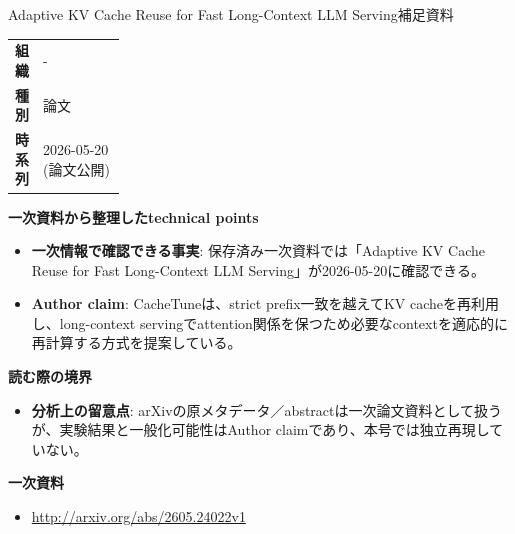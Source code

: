 \begin{technicalnote}{Adaptive KV Cache Reuse for Fast Long-Context LLM Serving}{補足資料}
\begingroup
\begin{tabularx}{\linewidth}{@{}>{\bfseries}p{0.22\linewidth}X@{}}
組織 & - \\
種別 & 論文 \\
時系列 & 2026-05-20 (論文公開) \\
\end{tabularx}
\smallskip
{\bfseries 一次資料から整理したtechnical points}
\begin{itemize}[leftmargin=1.5em,itemsep=0.35em]
\item \textbf{一次情報で確認できる事実}: 保存済み一次資料では「Adaptive KV Cache Reuse for Fast Long-Context LLM Serving」が2026-05-20に確認できる。
\item \textbf{Author claim}: CacheTuneは、strict prefix一致を越えてKV cacheを再利用し、long-context servingでattention関係を保つため必要なcontextを適応的に再計算する方式を提案している。
\end{itemize}
{\bfseries 読む際の境界}
\begin{itemize}[leftmargin=1.5em,itemsep=0.35em]
\item \textbf{分析上の留意点}: arXivの原メタデータ／abstractは一次論文資料として扱うが、実験結果と一般化可能性はAuthor claimであり、本号では独立再現していない。
\end{itemize}
\begin{samepage}
{\bfseries 一次資料}
\begingroup\sloppy
\begin{itemize}[leftmargin=1.5em,itemsep=0.25em]
\item {\scriptsize\url{http://arxiv.org/abs/2605.24022v1}}
\end{itemize}
\endgroup
\end{samepage}
\endgroup
\end{technicalnote}
\medskip

